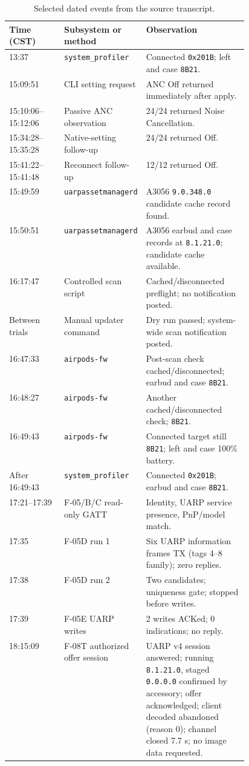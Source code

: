 \documentclass[11pt,letterpaper]{article}
\begin{document}
\begin{table}[H]\centering\small
\caption{Selected dated events from the source transcript.}
\begin{tabularx}{\linewidth}{@{}p{0.23\linewidth}p{0.23\linewidth}X@{}}\toprule
Time (CST) & Subsystem or method & Observation \\ \midrule
13:37 & \texttt{system\_profiler} & Connected \texttt{0x201B}; left and case \texttt{8B21}. \\
15:09:51 & CLI setting request & ANC Off returned immediately after apply. \\
15:10:06--15:12:06 & Passive ANC observation & 24/24 returned Noise Cancellation. \\
15:34:28--15:35:28 & Native-setting follow-up & 24/24 returned Off. \\
15:41:22--15:41:48 & Reconnect follow-up & 12/12 returned Off. \\
15:49:59 & \texttt{uarpassetmanagerd} & A3056 \texttt{9.0.348.0} candidate cache record found. \\
15:50:51 & \texttt{uarpassetmanagerd} & A3056 earbud and case records at \texttt{8.1.21.0}; candidate cache available. \\
16:17:47 & Controlled scan script & Cached/disconnected preflight; no notification posted. \\
Between trials & Manual updater command & Dry run passed; system-wide scan notification posted. \\
16:47:33 & \texttt{airpods-fw} & Post-scan check cached/disconnected; earbud and case \texttt{8B21}. \\
16:48:27 & \texttt{airpods-fw} & Another cached/disconnected check; \texttt{8B21}. \\
16:49:43 & \texttt{airpods-fw} & Connected target still \texttt{8B21}; left and case 100\% battery. \\
After 16:49:43 & \texttt{system\_profiler} & Connected \texttt{0x201B}; earbud and case \texttt{8B21}. \\
17:21--17:39 & F-05/B/C read-only GATT & Identity, UARP service presence, PnP/model match. \\
17:35 & F-05D run 1 & Six UARP information frames TX (tags 4--8 family); zero replies. \\
17:38 & F-05D run 2 & Two candidates; uniqueness gate; stopped before writes. \\
17:39 & F-05E UARP writes & 2 writes ACKed; 0 indications; no reply. \\
18:15:09 & F-08T authorized offer session & UARP v4 session answered; running \texttt{8.1.21.0}, staged \texttt{0.0.0.0} confirmed by accessory; offer acknowledged; client decoded abandoned (reason 0); channel closed 7.7 s; no image data requested. \\

\end{tabularx}
\end{table}
\end{document}
